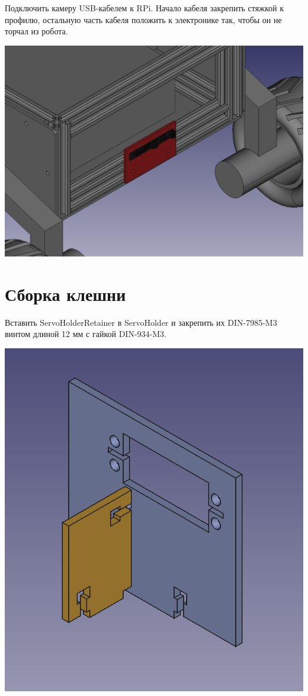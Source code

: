 \documentclass[12pt,a4paper,oneside]{article}
\begin{document}
Подключить камеру USB-кабелем к RPi. Начало кабеля закрепить стяжкой к профилю,
остальную часть кабеля положить к электронике так, чтобы он не торчал из робота.

\includegraphics[width=\textwidth]{cameraholder}


\section{Сборка клешни}

Вставить ServoHolderRetainer в ServoHolder и закрепить их DIN-7985-M3 винтом
длиной 12 мм с гайкой DIN-934-M3.

\includegraphics[width=\textwidth]{servoholder}
\end{document}
